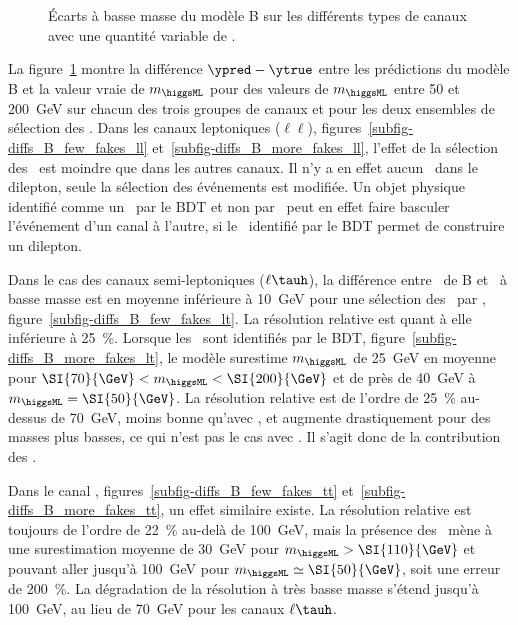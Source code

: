 \begin{figure}[p]
\caption[Effet des \ftauhs\ sur l'écart des prédictions du modèle B à la valeur vraie.]{Écarts à basse masse du modèle B sur les différents types de canaux avec une quantité variable de \ftauhs.}
\label{fig-diffs_fakes_B_tt-lt-ll}
\end{figure}
\par
La figure~\ref{fig-diffs_fakes_B_tt-lt-ll} montre la différence $\ypred-\ytrue$ entre les prédictions du modèle B et la valeur vraie de $m_{\higgsML}$ pour des valeurs de $m_{\higgsML}$ entre \num{50} et \SI{200}{\GeV} sur chacun des trois groupes de canaux et pour les deux ensembles de sélection des \tauh.
Dans les canaux leptoniques ($\ell\ell$),
figures~\ref{subfig-diffs_B_few_fakes_ll} et~\ref{subfig-diffs_B_more_fakes_ll},
l'effet de la sélection des \tauh\
est moindre que dans les autres canaux.
Il n'y a en effet aucun \tauh\ dans le dilepton, seule la sélection des événements est modifiée.
Un objet physique identifié comme un \tauh\ par le BDT et non par \DEEPTAU\ peut en effet faire basculer l'événement d'un canal à l'autre, si le \tauh\ identifié par le BDT permet de construire un dilepton.
\par
Dans le cas des canaux semi-leptoniques ($\ell\tauh$),
la différence entre \ypred\ de B et \ytrue\ à basse masse est en moyenne inférieure à \SI{10}{\GeV}
pour une sélection des \tauh\ par \DEEPTAU, figure~\ref{subfig-diffs_B_few_fakes_lt}.
La résolution relative est quant à elle inférieure à \SI{25}{\%}.
Lorsque les \tauh\ sont identifiés par le BDT,
figure~\ref{subfig-diffs_B_more_fakes_lt},
le modèle surestime $m_{\higgsML}$ de \SI{25}{\GeV} en moyenne pour $\SI{70}{\GeV} < m_{\higgsML} < \SI{200}{\GeV}$
et de près de \SI{40}{\GeV} à $m_{\higgsML}=\SI{50}{\GeV}$.
La résolution relative est de l'ordre de \SI{25}{\%} au-dessus de \SI{70}{\GeV},
moins bonne qu'avec \DEEPTAU,
et augmente drastiquement pour des masses plus basses, ce qui n'est pas le cas avec \DEEPTAU.
Il s'agit donc de la contribution des \ftauhs.
\par
Dans le canal \tauh\tauh,
figures~\ref{subfig-diffs_B_few_fakes_tt} et~\ref{subfig-diffs_B_more_fakes_tt},
un effet similaire existe.
La résolution relative est toujours de l'ordre de \SI{22}{\%} au-delà de \SI{100}{\GeV},
mais la présence des \ftauhs\ mène à une surestimation moyenne de \SI{30}{\GeV} pour $m_{\higgsML}>\SI{110}{\GeV}$
et pouvant aller jusqu'à \SI{100}{\GeV} pour $m_{\higgsML}\simeq\SI{50}{\GeV}$, soit une erreur de \SI{200}{\%}.
La dégradation de la résolution à très basse masse s'étend jusqu'à \SI{100}{\GeV}, au lieu de \SI{70}{\GeV} pour les canaux $\ell\tauh$.
